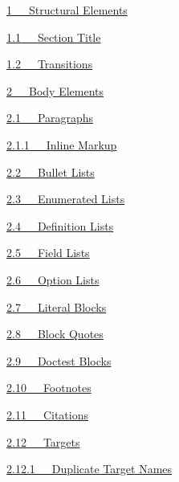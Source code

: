 \documentclass[10pt,a4paper,english]{article}
\begin{document}
\begin{list}{}{}
\item {} \href{\#structural-elements}{1~~~Structural Elements}
\begin{list}{}{}
\item {} \href{\#section-title}{1.1~~~Section Title}

\item {} \href{\#transitions}{1.2~~~Transitions}

\end{list}

\item {} \href{\#body-elements}{2~~~Body Elements}
\begin{list}{}{}
\item {} \href{\#paragraphs}{2.1~~~Paragraphs}
\begin{list}{}{}
\item {} \href{\#inline-markup}{2.1.1~~~Inline Markup}

\end{list}

\item {} \href{\#bullet-lists}{2.2~~~Bullet Lists}

\item {} \href{\#enumerated-lists}{2.3~~~Enumerated Lists}

\item {} \href{\#definition-lists}{2.4~~~Definition Lists}

\item {} \href{\#field-lists}{2.5~~~Field Lists}

\item {} \href{\#option-lists}{2.6~~~Option Lists}

\item {} \href{\#literal-blocks}{2.7~~~Literal Blocks}

\item {} \href{\#block-quotes}{2.8~~~Block Quotes}

\item {} \href{\#doctest-blocks}{2.9~~~Doctest Blocks}

\item {} \href{\#footnotes}{2.10~~~Footnotes}

\item {} \href{\#citations}{2.11~~~Citations}

\item {} \href{\#targets}{2.12~~~Targets}
\begin{list}{}{}
\item {} \href{\#duplicate-target-names}{2.12.1~~~Duplicate Target Names}


\end{list}
\end{list}
\end{list}
\end{document}
